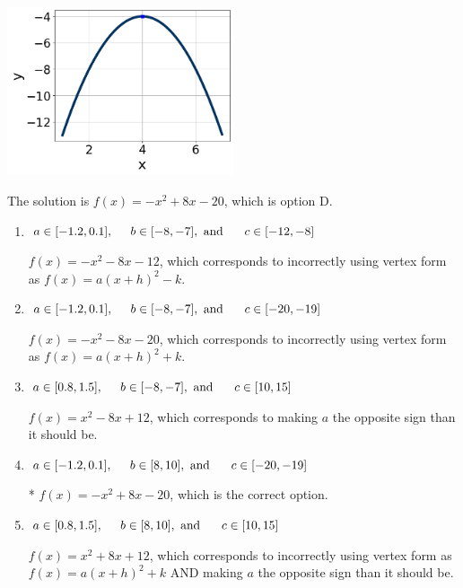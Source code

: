 \documentclass{extbook}[14pt]
\begin{document}
\begin{enumerate}
{\begin{center}
    \includegraphics[width=0.5\textwidth]{../Figures/quadraticGraphToEquationCopyB.png}
\end{center}


The solution is \( f(x) = -x^{2} +8 x -20 \), which is option D.\begin{enumerate}[label=\Alph*.]
\item \( a \in [-1.2, 0.1], \hspace*{5mm} b \in [-8, -7], \text{ and } \hspace*{5mm} c \in [-12, -8] \)

$f(x)=-x^{2} -8 x -12$, which corresponds to incorrectly using vertex form as $f(x) = a(x+h)^2 - k$.
\item \( a \in [-1.2, 0.1], \hspace*{5mm} b \in [-8, -7], \text{ and } \hspace*{5mm} c \in [-20, -19] \)

$f(x)=-x^{2} -8 x -20$, which corresponds to incorrectly using vertex form as $f(x) = a(x+h)^2+k$.
\item \( a \in [0.8, 1.5], \hspace*{5mm} b \in [-8, -7], \text{ and } \hspace*{5mm} c \in [10, 15] \)

$f(x)=x^{2} -8 x + 12$, which corresponds to making $a$ the opposite sign than it should be.
\item \( a \in [-1.2, 0.1], \hspace*{5mm} b \in [8, 10], \text{ and } \hspace*{5mm} c \in [-20, -19] \)

* $f(x)=-x^{2} +8 x -20$, which is the correct option.
\item \( a \in [0.8, 1.5], \hspace*{5mm} b \in [8, 10], \text{ and } \hspace*{5mm} c \in [10, 15] \)

$f(x)=x^{2} +8 x + 12$, which corresponds to incorrectly using vertex form as $f(x) = a(x+h)^2+k$ AND making $a$ the opposite sign than it should be.
\end{enumerate}

}
\end{enumerate}
\end{document}
